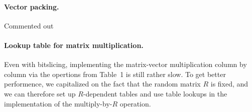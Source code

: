 \paragraph{Vector packing.}
Commented out

\iffalse

\subsubsection{Integer packing  operations} Another method that was explored for optimization was integer packing. 
Since in our case we need to multiply a $Z_3$ vector of dimension $m=256$ by a trinary matrix, then each entry in the result can be as large as $256 \times 4 = 1024$, but not larger.
We therefore allocated 10 bits for each entry (capable of holding numbers between 0 and 1023), so we can pack such numbers into each word. Specifically, the vector $(X_0 ... X_5)$ over $Z_3$ is represented as the integer $y = \sum_{i=0}^6 512^i \times x_i$.

When performing the matrix-vector multiplication, multiple rows the matrix were packed using integer-packing. 
Specifically, the matrix was divided into packs of 6 items each belonging to the same column and  consecutive rows, i.e.,  $R_{i,j}$ where ${i = (6 \times l) ... (6 \times l + 5)}$ were packed into one word, resulting in two matrices of size $14 x 256$. The matrix was then multipled by the trinary vector. The results was divided into consecutive items of 10 bits each and the value $\mod 3$ was calculated as the result

\fi


\paragraph{Lookup table for matrix multiplication.}
Even with bitslicing, implementing the matrix-vector multiplication column by column via the opertions from Table~1 is still rather slow.
To get better performence, we capitalized on the fact that the random matrix $R$ is fixed, and we can therefore set up $R$-dependent tables and use table lookups in the implementation of the multiply-by-$R$ operation.

